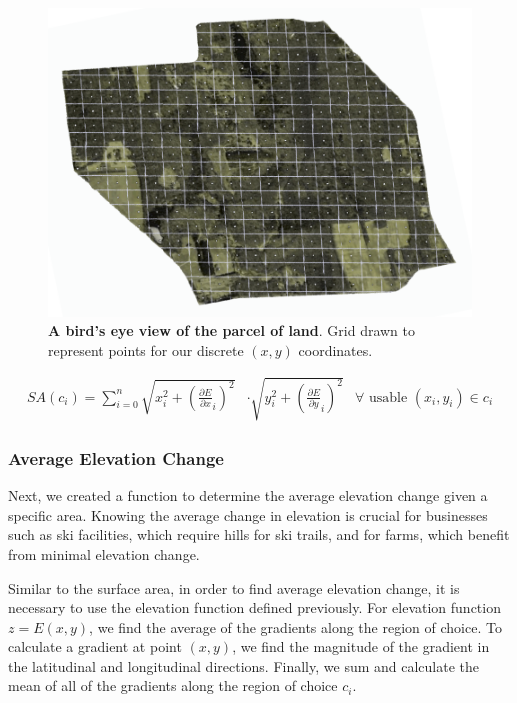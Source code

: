 \documentclass{mcmthesis}
\begin{document}
\begin{figure}[!htbp]
\centering
    \includegraphics[scale=0.5]{figures/land_parcel_above.png}
    \captionsetup{width=0.8\textwidth}
    \caption{\textbf{A bird's eye view of the parcel of land}. Grid drawn to represent  points for our discrete $(x, y)$ coordinates.}
    \label{fig:landparcel}
\end{figure}

\begin{align}
    SA(c_i) = \sum_{i=0}^{n} \sqrt{x_i^2 + \left(\frac{\partial E}{\partial x}_i\right)^2} & \cdot \sqrt{y_i^2 + \left(\frac{\partial E}{\partial y}_i\right)^2} 
    & \forall \text{ usable }(x_i, y_i) \in c_i
    \label{Eq:SurfaceArea}
\end{align}

\subsubsection{Average Elevation Change}

Next, we created a function to determine the average elevation change given a specific area. Knowing the average change in elevation is crucial for businesses such as ski facilities, which require hills for ski trails, and for farms, which benefit from minimal elevation change. 

Similar to the surface area, in order to find average elevation change, it is necessary to use the elevation function defined previously. For elevation function $z = E(x, y)$, we find the average of the gradients along the region of choice. To calculate a gradient at point $(x, y)$, we find the magnitude of the gradient in the latitudinal and longitudinal directions. Finally, we sum and calculate the mean of all of the gradients along the region of choice $c_i$. 
\end{document}
